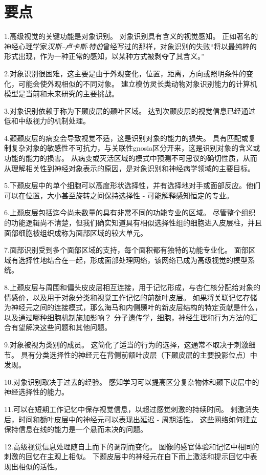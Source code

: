 \section{要点}

1.高级视觉的关键功能是对象识别。
对象识别具有含义的视觉感知。
正如著名的神经心理学家\textit{汉斯–卢卡斯$\cdot$特伯}曾经写过的那样，对象识别的失败“将以最纯粹的形式出现，作为一种正常的感知，以某种方式被剥夺了其含义。” 


2.对象识别很困难，这主要是由于外观变化，位置，距离，方向或照明条件的变化，可能会使外观相似的不同对象。
建立模仿灵长类动物对象识别能力的计算机模型是当前和未来研究的主要挑战。


3.对象识别依赖于称为下颞皮层的颞叶区域。
达到次颞皮层的视觉信息已经通过低和中级视力的机制处理。


4.颞颞皮层的病变会导致视觉不适，这是识别对象的能力的损失。
具有匹配或复制复杂对象的敏感性不可抗力，与关联性gnosia区分开来，这是识别对象的含义或功能的能力的损害。
从病变或灭活区域的模式中预测不可思议的确切性质，从而从理解相关性到神经对象表示的原因，是对象识别和神经病学领域的主要目标。 


5.下颞皮层中的单个细胞可以高度形状选择性，并有选择地对手或面部反应。他们可以在位置，大小甚至旋转之间保持选择性 - 可能解释感知恒定的专业。


6.上颞皮层包括迄今尚未数量的具有非常不同的功能专业的区域。
尽管整个组织的功能逻辑尚不清楚，但我们确实知道具有相似选择性组的细胞进入皮层柱，并且面部细胞被组织成称为面部区域的较大单元。 


7.面部识别受到多个面部区域的支持，每个面积都有独特的功能专业化。
面部区域有选择性地结合在一起，形成面部处理网络，该网络已成为高级视觉的模型系统。


8.上颞皮层与周围和偏头皮皮层相互连接，用于记忆形成，与杏仁核分配给对象的情感价，以及用于对象分类和视觉工作记忆的前额叶皮层。
如果将关联记忆存储为神经元之间的连接模式，那么海马和内侧颞叶的新皮层结构的特定贡献是什么，以及通过哪种细胞机制施加影响？
分子遗传学，细胞，神经生理和行为方法的汇合有望解决这些问题和其他问题。


9.对象被视为类别的成员。
这简化了适当的行为的选择，这通常不取决于刺激细节。 具有分类选择性的神经元在背侧前额叶皮层（下颞皮层的主要投影位点）中发现。


10.对象识别取决于过去的经验。
感知学习可以提高区分复杂物体和颞下皮层中的神经选择性的能力。


11.可以在短期工作记忆中保存视觉信息，以超过感觉刺激的持续时间。
刺激消失后，时间和额叶皮层中的神经元可以表现出延迟 - 周期活性。
这些网络如何建立保持信息在线的能力是一个悬而未决的问题。


12.高级视觉信息处理随自上而下的调制而变化。
图像的感官体验和记忆中相同的刺激的回忆在主观上相似。
下颞皮层中的神经元在自下而上激活和提示回忆中表现出相似的活性。


